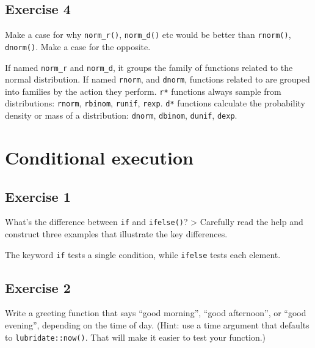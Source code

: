 \documentclass[]{book}
\theoremstyle{definition}
\theoremstyle{definition}
\theoremstyle{definition}
\theoremstyle{remark}
\begin{document}
\hypertarget{exercise-4-25}{%
\subsection{Exercise 4}\label{exercise-4-25}}

Make a case for why \texttt{norm\_r()}, \texttt{norm\_d()} etc would be
better than \texttt{rnorm()}, \texttt{dnorm()}. Make a case for the
opposite.

If named \texttt{norm\_r} and \texttt{norm\_d}, it groups the family of
functions related to the normal distribution. If named \texttt{rnorm},
and \texttt{dnorm}, functions related to are grouped into families by
the action they perform. \texttt{r*} functions always sample from
distributions: \texttt{rnorm}, \texttt{rbinom}, \texttt{runif},
\texttt{rexp}. \texttt{d*} functions calculate the probability density
or mass of a distribution: \texttt{dnorm}, \texttt{dbinom},
\texttt{dunif}, \texttt{dexp}.

\hypertarget{conditional-execution}{%
\section{Conditional execution}\label{conditional-execution}}

\hypertarget{exercise-1-46}{%
\subsection{Exercise 1}\label{exercise-1-46}}

What's the difference between \texttt{if} and \texttt{ifelse()}?
\textgreater{} Carefully read the help and construct three examples that
illustrate the key differences.

The keyword \texttt{if} tests a single condition, while \texttt{ifelse}
tests each element.

\hypertarget{exercise-2-45}{%
\subsection{Exercise 2}\label{exercise-2-45}}

Write a greeting function that says ``good morning'', ``good
afternoon'', or ``good evening'', depending on the time of day. (Hint:
use a time argument that defaults to \texttt{lubridate::now()}. That
will make it easier to test your function.)
\end{document}
